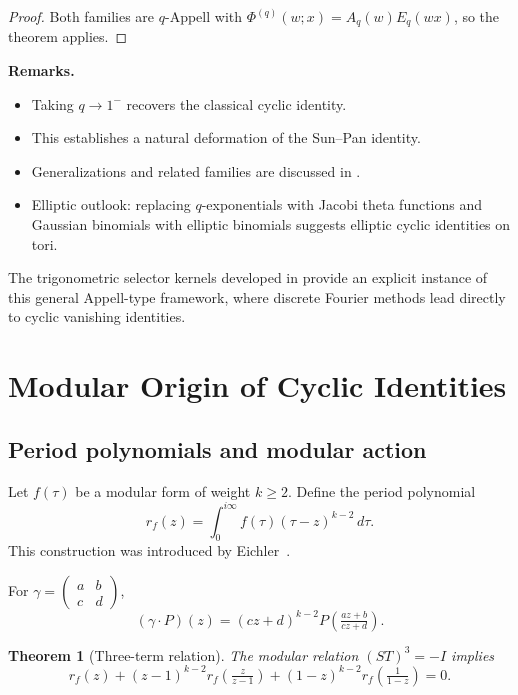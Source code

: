 \documentclass[12pt]{article}
\numberwithin{equation}{section}
\newtheorem{theorem}{Theorem}[section]
\begin{document}
\begin{proof}
Both families are $q$-Appell with $\Phi^{(q)}(w;x)=A_q(w)E_q(wx)$, so the
theorem applies.
\end{proof}

\noindent\textbf{Remarks.}
\begin{itemize}
\item Taking $q\to 1^-$ recovers the classical cyclic identity.
\item This establishes a natural deformation of the Sun--Pan identity.
\item Generalizations and related families are discussed in \cite{DingYang2013}.
\item Elliptic outlook: replacing $q$-exponentials with Jacobi theta
functions and Gaussian binomials with elliptic binomials suggests elliptic
cyclic identities on tori.
\end{itemize}
The trigonometric selector kernels developed in \cite{Nagai2025a}
provide an explicit instance of this general Appell-type framework,
where discrete Fourier methods lead directly to cyclic vanishing
identities.


\section{Modular Origin of Cyclic Identities}

\subsection*{Period polynomials and modular action}

Let $f(\tau)$ be a modular form of weight $k\ge2$.  
Define the period polynomial
\[
r_f(z)=\int_0^{i\infty} f(\tau)(\tau-z)^{k-2}\,d\tau.
\]
This construction was introduced by Eichler~\cite{Eichler1957}.

For $\gamma=\begin{pmatrix}a&b\\c&d\end{pmatrix}$,
\[
(\gamma\cdot P)(z)=(cz+d)^{k-2}P\!\left(\tfrac{az+b}{cz+d}\right).
\]

\begin{theorem}[Three-term relation]
The modular relation $(ST)^3=-I$ implies
\[
r_f(z)+(z-1)^{k-2}r_f\!\left(\tfrac{z}{z-1}\right)
+(1-z)^{k-2}r_f\!\left(\tfrac{1}{1-z}\right)=0.
\]
\end{theorem}
\end{document}
